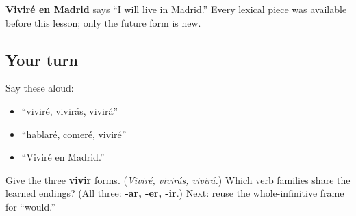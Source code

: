 \begin{grammarlens}[title={Grammar Lens: meaning with known words}]
\textbf{Viviré en Madrid} says “I will live in Madrid.” Every lexical piece was available before this lesson; only the future form is new.
\end{grammarlens}

\subsection*{Your turn}
Say these aloud:

\begin{itemize}
\raggedright
  \item “viviré, vivirás, vivirá”
  \item “hablaré, comeré, viviré”
  \item “Viviré en Madrid.”
\end{itemize}

\begin{tcolorbox}[breakable,colback=teal!4,colframe=teal!35!black,title={Before you move on}]
Give the three \textbf{vivir} forms. (\emph{Viviré, vivirás, vivirá.}) Which verb families share the learned endings? (All three: \textbf{-ar, -er, -ir}.) Next: reuse the whole-infinitive frame for “would.”
\end{tcolorbox}
